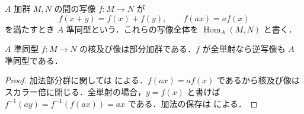 \begin{defn}[加群準同型]
$A$ 加群 $M,N$ の間の写像 $f:M\to N$ が
\[
 f(x+y)=f(x)+f(y),\qquad f(ax)=af(x)
\]
を満たすとき $A$ 準同型という．これらの写像全体を $\operatorname{Hom}_A(M,N)$ と書く．
\end{defn}
\begin{prop}[加群準同型の核と像]
$A$ 準同型 $f:M\to N$ の核及び像は部分加群である．$f$ が全単射なら逆写像も $A$ 準同型である．
\end{prop}
\begin{proof}
加法部分群に関しては  による．$f(ax)=af(x)$ であるから核及び像はスカラー倍に閉じる．全単射の場合，$y=f(x)$ と書けば $f^{-1}(ay)=f^{-1}(f(ax))=ax$ である．加法の保存は  による．
\end{proof}
